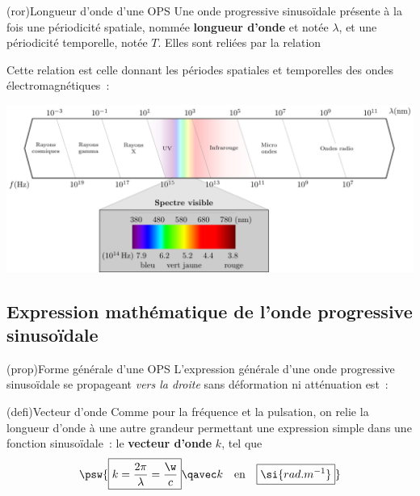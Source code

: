 \documentclass[../../main/main.tex]{subfiles}
\begin{document}
\begin{tcb}(ror){Longueur d'onde d'une OPS}
	Une onde progressive sinusoïdale présente à la fois une périodicité spatiale,
	nommée \textbf{longueur d'onde} et notée $\lambda$, et une périodicité
	temporelle, notée $T$. Elles sont reliées par la relation
	\psw{%
		\[\boxed{\lambda = cT = \frac{c}{f}}\]
	}
	\vspace{-15pt}
\end{tcb}

Cette relation est celle donnant les périodes spatiales et temporelles des ondes
électromagnétiques~:
\vspace{-25pt}
\begin{center}
	\includegraphics[width=.95\linewidth]{full_spectre}
\end{center}

\subsection{Expression mathématique de l'onde progressive sinusoïdale}

\begin{tcb*}(prop){Forme générale d'une OPS}
	L'expression générale d'une onde progressive sinusoïdale se propageant
	\textit{vers la droite} sans déformation ni atténuation est~:
	\vspace{-10pt}
\end{tcb*}

\begin{tcb*}(defi){Vecteur d'onde}
	Comme pour la fréquence et la pulsation, on relie la longueur d'onde à une
	autre grandeur permettant une expression simple dans une fonction
	sinusoïdale~: le \textbf{vecteur d'onde} $k$, tel que
	\[
		\psw{\boxed{k = \frac{2\pi}{\lambda} = \frac{\w}{c}}
			\qavec
			k\quad\text{en}\quad\boxed{\si{rad.m^{-1}}}}
	\]
\end{tcb*}
\end{document}
